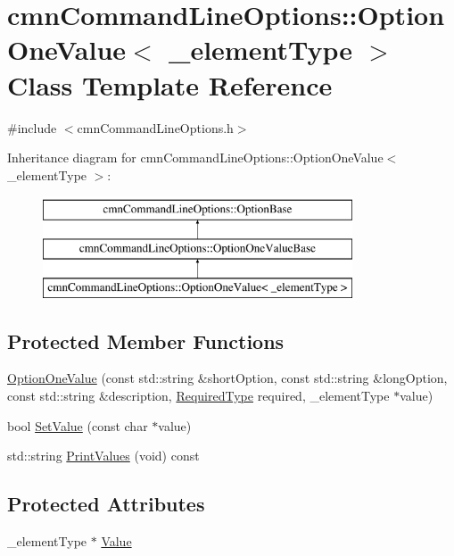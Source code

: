 \hypertarget{classcmn_command_line_options_1_1_option_one_value}{}\section{cmn\+Command\+Line\+Options\+:\+:Option\+One\+Value$<$ \+\_\+element\+Type $>$ Class Template Reference}
\label{classcmn_command_line_options_1_1_option_one_value}


{\ttfamily \#include $<$cmn\+Command\+Line\+Options.\+h$>$}

Inheritance diagram for cmn\+Command\+Line\+Options\+:\+:Option\+One\+Value$<$ \+\_\+element\+Type $>$\+:\begin{figure}[H]
\begin{center}
\leavevmode
\includegraphics[height=3.000000cm]{de/d9b/classcmn_command_line_options_1_1_option_one_value}
\end{center}
\end{figure}
\subsection*{Protected Member Functions}
\begin{DoxyCompactItemize}
\item 
\hyperlink{classcmn_command_line_options_1_1_option_one_value_a225ab65ac17ffac26683ac170f5df9e8}{Option\+One\+Value} (const std\+::string \&short\+Option, const std\+::string \&long\+Option, const std\+::string \&description, \hyperlink{group__cisst_common_gac239a3ca62dd4e3b391824f6f1a97c76}{Required\+Type} required, \+\_\+element\+Type $\ast$value)
\item 
bool \hyperlink{classcmn_command_line_options_1_1_option_one_value_a2b55be408875478f887e01550837cd1e}{Set\+Value} (const char $\ast$value)
\item 
std\+::string \hyperlink{classcmn_command_line_options_1_1_option_one_value_a01fcb11ad03b693bd181a83dfafe2d58}{Print\+Values} (void) const 
\end{DoxyCompactItemize}
\subsection*{Protected Attributes}
\begin{DoxyCompactItemize}
\item 
\+\_\+element\+Type $\ast$ \hyperlink{classcmn_command_line_options_1_1_option_one_value_a340ec92ab141ab98bc7469c78e970eb6}{Value}
\end{DoxyCompactItemize}
